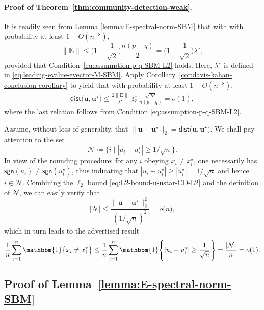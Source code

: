 \paragraph{Proof of Theorem~\ref{thm:community-detection-weak}.}
%
It is readily seen from Lemma \ref{lemma:E-spectral-norm-SBM} that with with probability at least  $1-O(n^{-8})$,
%
\[
	\|\bm{E}\| \leq \Big(1-\frac{1}{\sqrt{2}}\Big) \frac{n(p-q)}{2}  = \Big(1-\frac{1}{\sqrt{2}}\Big) \lambda^{\star},
\]
%
provided that Condition~\eqref{eq:assumption-p-q-SBM-L2} holds. Here, $\lambda^{\star}$ is defined in \eqref{eq:leading-evalue-evector-M-SBM}. Apply Corollary~\ref{cor:davis-kahan-conclusion-corollary} to yield that with probability at least  $1-O(n^{-8})$,
%
\begin{align}
	\mathsf{dist}\big(\bm{u},\bm{u}^{\star}\big)\leq\frac{2\|\bm{E}\|}{\lambda^{\star}}\lesssim\frac{\sqrt{np}}{n(p-q)}	=o(1),
	\label{eq:L2-bound-u-ustar-CD-L2}
\end{align}
%
where the last relation follows from Condition \eqref{eq:assumption-p-q-SBM-L2}.


Assume, without loss of generality, that $\|\bm{u}-\bm{u}^{\star}\|_{2}=\mathsf{dist}\big(\bm{u},\bm{u}^{\star}\big)$.
We shall pay attention to the set
%
$$
	\mathcal{N}\coloneqq \big\{ i\mid |u_{i}-u_{i}^{\star}| \geq {1}/{\sqrt{n}}\big\}.
$$
%
In view of the rounding procedure: for any $i$ obeying $x_{i}\neq x_{i}^{\star}$, one necessarily has $\mathsf{sgn}(u_{i})\neq \mathsf{sgn}(u_{i}^{\star})$,
thus indicating that $|u_i - u_{i}^{\star}| \geq |u_{i}^{\star}| = 1/\sqrt{n}$ and hence $i\in \mathcal{N}$.
Combining the $\ell_2$ bound \eqref{eq:L2-bound-u-ustar-CD-L2} and the definition of $\mathcal{N}$, we can easily verify that
%
\[
|\mathcal{N}|\leq\frac{\|\bm{u}-\bm{u}^{\star}\|_{2}^{2}}{(1/\sqrt{n})^{2}}=o\big(n\big),
\]
%
which in turn leads to the advertised result
%
\[
	\frac{1}{n}\sum_{i=1}^{n} \mathbbm{1} \big\{ x_{i}\neq x_{i}^{\star}\big\}
	\leq \frac{1}{n}\sum_{i=1}^{n} \mathbbm{1} \Bigg \{ |u_i - u_{i}^{\star}| \geq \frac{1}{\sqrt{n}} \Bigg\}
	= \frac{|\mathcal{N}|}{n}=o(1) .
\]
%



\subsection{Proof of Lemma~\ref{lemma:E-spectral-norm-SBM}}
\label{sec:proof-auxiliary-lemmas-community-detection}


